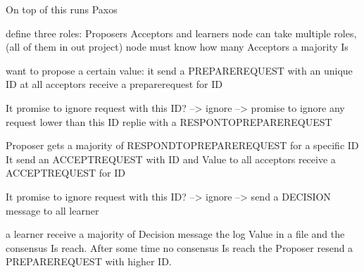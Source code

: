 \documentclass{beamer}
\begin{document}
\begin{frame}
  \begin{center}
    \huge On top of this runs Paxos
  \end{center}
\end{frame}

\begin{frame}
  \Paxos
  \begin{itemize}
  \Paxos define three roles: Proposers Acceptors and learners
  \Paxos node can take multiple roles, (all of them in out project)
  \Paxos node must know how many Acceptors a majority Is
  \end{itemize}
\end{frame}

\begin{frame}
  \begin{itemize}
  \Proposer want to propose a certain value: it send a PREPAREREQUEST with an unique ID at all acceptors
  \Acceptor receive a preparerequest for ID
  \begin{itemize}
  \Did It promise to ignore request with this ID?
  \Yes --> ignore
  \No --> promise to ignore any request lower than this ID replie with a RESPONTOPREPAREREQUEST
  \end{itemize}
  \end{itemize}
\end{frame}


\begin{frame}
  \begin{itemize}
  \If Proposer gets a majority of RESPONDTOPREPAREREQUEST for a specific ID It send an ACCEPTREQUEST with ID and Value to all acceptors
  \Acceptor receive a ACCEPTREQUEST for ID
  \begin{itemize}
  \Did It promise to ignore request with this ID?
  \Yes --> ignore
  \No --> send a DECISION message to all learner
  \end{itemize}
  \When a learner receive a majority of Decision message the log Value in a file and the consensus Is reach.
  \If After some time no consensus Is reach the Proposer resend a PREPAREREQUEST with higher ID.
  \end{itemize}
\end{frame}
\end{document}
